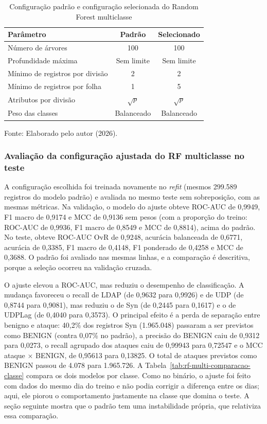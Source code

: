 \documentclass[
    12pt,                %
    openright,           %
    oneside,             %
    a4paper,             %
    english,             %
    brazil               %
]{abntex2}
\begin{document}
\begin{table}
\centering
\caption{Configuração padrão e configuração selecionada do Random Forest multiclasse}
\label{tab:rf-multi-config-comparacao}
\begin{tabular}{lcc}
\hline
Parâmetro & Padrão & Selecionado \\
\hline
Número de árvores & 100 & 100 \\
Profundidade máxima & Sem limite & Sem limite \\
Mínimo de registros por divisão & 2 & 2 \\
Mínimo de registros por folha & 1 & 5 \\
Atributos por divisão & $\sqrt{p}$ & $\sqrt{p}$ \\
Peso das classes & Balanceado & Balanceado \\
\hline
\end{tabular}
\par\smallskip
Fonte: Elaborado pelo autor (2026).
\end{table}
 
 
\subsubsection{Avaliação da configuração ajustada do RF multiclasse no teste}
\label{sec:rf-multi-teste-ajustado}
 
A configuração escolhida foi treinada novamente no \textit{refit} (mesmos 299.589 registros do modelo padrão) e avaliada no mesmo teste sem sobreposição, com as mesmas métricas. Na validação, o modelo do ajuste obteve ROC-AUC de 0,9949, F1 macro de 0,9174 e MCC de 0,9136 sem pesos (com a proporção do treino: ROC-AUC de 0,9936, F1 macro de 0,8549 e MCC de 0,8814), acima do padrão. No teste, obteve ROC-AUC OvR de 0,9248, acurácia balanceada de 0,6771, acurácia de 0,3385, F1 macro de 0,4148, F1 ponderado de 0,4258 e MCC de 0,3688. O padrão foi avaliado nas mesmas linhas, e a comparação é descritiva, porque a seleção ocorreu na validação cruzada.
 
O ajuste elevou a ROC-AUC, mas reduziu o desempenho de classificação. A mudança favoreceu o recall de LDAP (de 0,9632 para 0,9926) e de UDP (de 0,8744 para 0,9081), mas reduziu o de Syn (de 0,2445 para 0,1617) e o de UDPLag (de 0,4040 para 0,3573). O principal efeito é a perda de separação entre benigno e ataque: 40,2\% dos registros Syn (1.965.048) passaram a ser previstos como BENIGN (contra 0,07\% no padrão), a precisão do BENIGN caiu de 0,9312 para 0,0273, o recall agrupado dos ataques caiu de 0,99943 para 0,72547 e o MCC ataque $\times$ BENIGN, de 0,95613 para 0,13825. O total de ataques previstos como BENIGN passou de 4.078 para 1.965.726. A Tabela~\ref{tab:rf-multi-comparacao-classe} compara os dois modelos por classe. Como no binário, o ajuste foi feito com dados do mesmo dia do treino e não podia corrigir a diferença entre os dias; aqui, ele piorou o comportamento justamente na classe que domina o teste. A seção seguinte mostra que o padrão tem uma instabilidade própria, que relativiza essa comparação.
 
\end{document}
